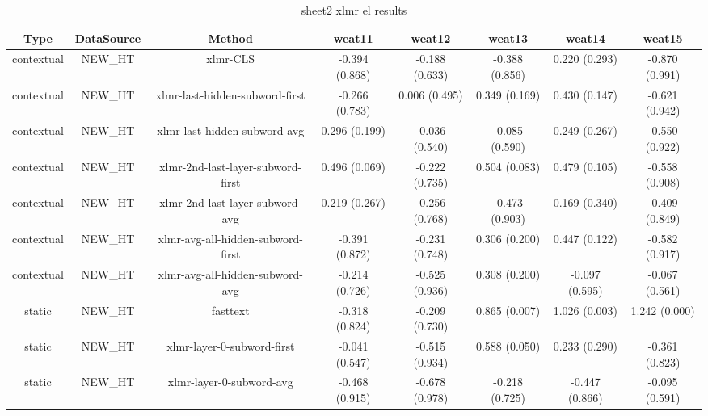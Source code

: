 \begin{sidewaystable}[htb]
    \centering
    \caption{sheet2 xlmr el results}
    \label{appendix_tab:sheet2_xlmr_el_results}
    \small
    \begin{tabular}{@{}cccccccc@{}}
        \toprule
        Type & DataSource & Method & weat11 & weat12 & weat13 & weat14 & weat15 \\
        \midrule
        contextual & NEW\_HT & xlmr-CLS & -0.394 (0.868) & -0.188 (0.633) & -0.388 (0.856) & 0.220 (0.293) & -0.870 (0.991) \\
        contextual & NEW\_HT & xlmr-last-hidden-subword-first & -0.266 (0.783) & 0.006 (0.495) & 0.349 (0.169) & 0.430 (0.147) & -0.621 (0.942) \\
        contextual & NEW\_HT & xlmr-last-hidden-subword-avg & 0.296 (0.199) & -0.036 (0.540) & -0.085 (0.590) & 0.249 (0.267) & -0.550 (0.922) \\
        contextual & NEW\_HT & xlmr-2nd-last-layer-subword-first & 0.496 (0.069) & -0.222 (0.735) & 0.504 (0.083) & 0.479 (0.105) & -0.558 (0.908) \\
        contextual & NEW\_HT & xlmr-2nd-last-layer-subword-avg & 0.219 (0.267) & -0.256 (0.768) & -0.473 (0.903) & 0.169 (0.340) & -0.409 (0.849) \\
        contextual & NEW\_HT & xlmr-avg-all-hidden-subword-first & -0.391 (0.872) & -0.231 (0.748) & 0.306 (0.200) & 0.447 (0.122) & -0.582 (0.917) \\
        contextual & NEW\_HT & xlmr-avg-all-hidden-subword-avg & -0.214 (0.726) & -0.525 (0.936) & 0.308 (0.200) & -0.097 (0.595) & -0.067 (0.561) \\
        static & NEW\_HT & fasttext & -0.318 (0.824) & -0.209 (0.730) & 0.865 (0.007) & 1.026 (0.003) & 1.242 (0.000) \\
        static & NEW\_HT & xlmr-layer-0-subword-first & -0.041 (0.547) & -0.515 (0.934) & 0.588 (0.050) & 0.233 (0.290) & -0.361 (0.823) \\
        static & NEW\_HT & xlmr-layer-0-subword-avg & -0.468 (0.915) & -0.678 (0.978) & -0.218 (0.725) & -0.447 (0.866) & -0.095 (0.591) \\
        \bottomrule
    \end{tabular}
\end{sidewaystable}
